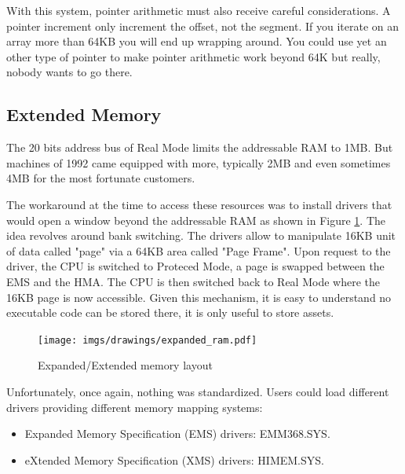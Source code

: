 \documentclass[book.tex]{subfiles}
\begin{document}
\begin{minipage}{\textwidth}

\end{minipage}
\par

With this system, pointer arithmetic must also receive careful considerations. A  pointer increment only increment the offset, not the segment. If you iterate on an array more than 64KB you will end up wrapping around. You could use yet an other type of pointer  to make pointer arithmetic work beyond 64K but really, nobody wants to go there.




  \subsection{Extended Memory}

The 20 bits address bus of Real Mode limits the addressable RAM to 1MB. But machines of 1992 came equipped with more, typically 2MB and even sometimes 4MB for the most fortunate customers.\\
\par 
The workaround at the time to access these resources was to install drivers that would open a window beyond the addressable RAM as shown in Figure \ref{fig:ems_xms_layout}. The idea revolves around bank switching. The drivers allow to manipulate 16KB unit of data called "page" via a 64KB area called "Page Frame". Upon request to the driver, the CPU is switched to Proteced Mode, a page is swapped between the EMS and the HMA. The CPU is then switched back to Real Mode where the 16KB page is now accessible. Given this mechanism, it is easy to understand no executable code can be stored there, it is only useful to store assets.

\begin{figure}[H]
\centering
\texttt{[image: imgs/drawings/expanded\_ram.pdf]}
\caption{Expanded/Extended memory layout}
\label{fig:ems_xms_layout}
\end{figure}
Unfortunately, once again, nothing was standardized. Users could load different drivers providing different memory mapping systems:
\begin{itemize}
\item Expanded Memory Specification (EMS) drivers: EMM368.SYS.
\item eXtended Memory Specification (XMS) drivers: HIMEM.SYS.
\end{itemize}
\end{document}
